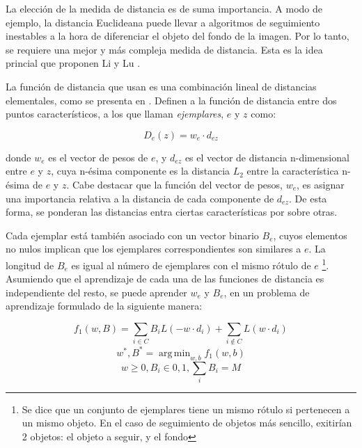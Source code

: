 \documentclass[a4paper,10pt]{article}
\DeclareMathOperator*{\argmin}{arg\,min}
\begin{document}
La elección de la medida de distancia es de suma importancia. A modo de
ejemplo, la distancia Euclideana puede llevar a algoritmos de seguimiento
inestables a la hora de diferenciar el objeto del fondo de la imagen. Por lo
tanto, se requiere una mejor y más compleja medida de distancia. Esta es la
idea princial que proponen Li y Lu \cite{local-learning}.

La función de distancia que usan es una combinación lineal de distancias
elementales, como se presenta en \cite{malisiewicz-cvpr08}. Definen a la
función de distancia entre dos puntos característicos, a los que llaman
\textit{ejemplares}, $e$ y $z$ como:

\begin{equation}
    \label{eq:distance-exemplar}
    D_{e}(z) = w_{e} \cdot d_{ez}
\end{equation}

donde $w_{e}$ es el vector de pesos de $e$, y $d_{ez}$ es el vector de
distancia n-dimensional entre $e$ y $z$, cuya n-ésima componente es la
distancia $L_{2}$ entre la característica n-ésima de $e$ y $z$. Cabe destacar
que la función del vector de pesos, $w_{e}$, es asignar una importancia relativa a
la distancia de cada componente de $d_{ez}$. De esta forma, se ponderan las distancias
entra ciertas características por sobre otras.

Cada ejemplar está también asociado con un vector binario $B_{e}$, cuyos elementos
no nulos implican que los ejemplares correspondientes son similares a $e$. La
longitud de $B_{e}$ es igual al número de ejemplares con el mismo rótulo de $e$
\footnote{Se dice que un conjunto de ejemplares tiene un mismo rótulo si pertenecen a un mismo objeto. En el caso de seguimiento de objetos
más sencillo, exitirían 2 objetos: el objeto a seguir, y el fondo}.
Asumiendo que el aprendizaje de cada una de las funciones de distancia es
independiente del resto, se puede aprender $w_{e}$ y $B_{e}$, en un problema
de aprendizaje formulado de la siguiente manera:

\begin{equation}
    \label{eq:learning-problem}
    f_{1}(w,B) = \sum_{i \in C} B_{i}L(-w \cdot d_{i}) + \sum_{i\notin C}L(w \cdot d_{i})
\end{equation}
\begin{equation}
    {w^{*}, B^{*} = \argmin_{w,b} f_{1} (w,b) }
\end{equation}
\begin{equation}
   w \geq 0, B_{i} \in {0,1}, \sum_{i} B_{i} = M
\end{equation}
\end{document}
